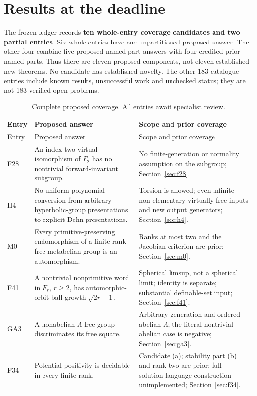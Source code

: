 \section{Results at the deadline}\label{sec:inventory}

The frozen ledger records \textbf{ten whole-entry coverage candidates and
two partial entries}. Six whole entries have one unpartitioned proposed
answer. The other four combine five proposed named-part answers with four
credited prior named parts. Thus there are eleven proposed components,
not eleven established new theorems. No candidate has established novelty.
The other 183 catalogue entries include known results, unsuccessful work
and unchecked status; they are not 183 verified open problems.

\begin{longtable}{@{}P{.10\textwidth}P{.43\textwidth}P{.41\textwidth}@{}}
\caption{Complete proposed coverage. All entries await specialist review.}\label{tab:whole}\\
\toprule Entry & Proposed answer & Scope and prior coverage \\\midrule
\endfirsthead
\toprule Entry & Proposed answer & Scope and prior coverage \\\midrule
\endhead
F28 & An index-two virtual isomorphism of $F_2$ has no nontrivial forward-invariant subgroup. & No finite-generation or normality assumption on the subgroup; Section~\ref{sec:f28}.\\[4pt]
H4 & No uniform polynomial conversion from arbitrary hyperbolic-group presentations to explicit Dehn presentations. & Torsion is allowed; even infinite non-elementary virtually free inputs and new output generators; Section~\ref{sec:h4}.\\[4pt]
M0 & Every primitive-preserving endomorphism of a finite-rank free metabelian group is an automorphism. & Ranks at most two and the Jacobian criterion are prior; Section~\ref{sec:m0}.\\[4pt]
F41 & A nontrivial nonprimitive word in $F_r$, $r\ge2$, has automorphic-orbit ball growth $\sqrt{2r-1}$. & Spherical limsup, not a spherical limit; identity is separate; substantial definable-set input; Section~\ref{sec:f41}.\\[4pt]
GA3 & A nonabelian $\Lambda$-free group discriminates its free square. & Arbitrary generation and ordered abelian $\Lambda$; the literal nontrivial abelian case is negative; Section~\ref{sec:ga3}.\\[4pt]
F34 & Potential positivity is decidable in every finite rank. & Candidate (a); stability part (b) and rank two are prior; full solution-language construction unimplemented; Section~\ref{sec:f34}.\\[4pt]

\end{longtable}
